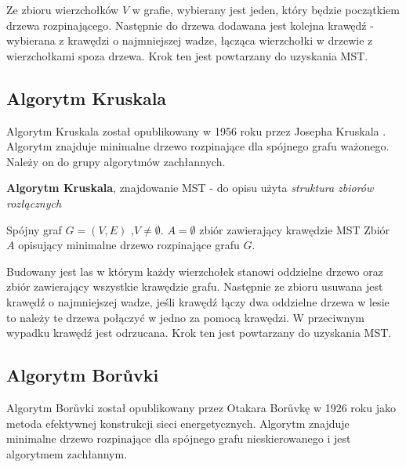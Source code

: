 \documentclass[a4paper, 10pt]{article}
\begin{document}
 Ze zbioru wierzchołków $V$ w grafie, wybierany jest jeden, który będzie początkiem drzewa rozpinającego. Następnie do drzewa dodawana jest   
kolejna krawędź - wybierana z krawędzi o najmniejszej wadze, łącząca wierzchołki w drzewie z wierzchołkami spoza drzewa. Krok ten jest powtarzany do uzyskania MST.

	
	\subsection{Algorytm Kruskala}
	

Algorytm Kruskala został opublikowany w 1956 roku przez Josepha Kruskala \cite{algo:kru}. Algorytm znajduje minimalne drzewo rozpinające dla spójnego grafu ważonego. Należy
on do grupy algorytmów zachłannych. 

\begin{algorithm}
\caption{{\bf Algorytm Kruskala}, znajdowanie MST - do opisu użyta \textit{struktura zbiorów rozłącznych}}
\begin{algorithmic}[!h]
\REQUIRE Spójny graf $G=(V,E)$ ,$V \neq \emptyset$. 
\ENSURE $A=\emptyset$ zbiór zawierający krawędzie MST
\ENDFOR 
{}
\ENDIF
\ENDFOR 
\RETURN Zbiór $A$ opisujący minimalne drzewo rozpinające grafu $G$.
\end{algorithmic}
\end{algorithm}
\FloatBarrier

Budowany jest las w którym każdy wierzchołek stanowi oddzielne drzewo oraz zbiór zawierający wszystkie krawędzie grafu.
Następnie ze zbioru usuwana jest krawędź o najmniejszej wadze, jeśli krawędź łączy dwa oddzielne drzewa w lesie	to należy te drzewa połączyć w jedno za pomocą
krawędzi. W przeciwnym wypadku krawędź jest odrzucana. Krok ten jest powtarzany do uzyskania MST.

	\subsection{Algorytm Borůvki}
	

Algorytm Borůvki został opublikowany przez Otakara Borůvkę \cite{algo:bor} w 1926 roku jako metoda efektywnej konstrukcji sieci 
energetycznych. Algorytm znajduje minimalne drzewo rozpinające dla spójnego grafu nieskierowanego i jest algorytmem zachłannym.
\end{document}
